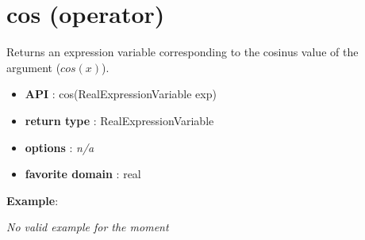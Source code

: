 \label{cos}
\hypertarget{cos}{}

\section{cos (operator)}\label{cos:cosoperator}\hypertarget{cos:cosoperator}{}
Returns an expression variable corresponding to the cosinus value of the argument (\(cos(x)\)).

\begin{itemize}
	\item \textbf{API} : cos(RealExpressionVariable exp)
	\item \textbf{return type} : RealExpressionVariable
	\item \textbf{options} : \emph{n/a}
	\item \textbf{favorite domain} : real
\end{itemize}

\textbf{Example}:

\emph{No valid example for the moment}
